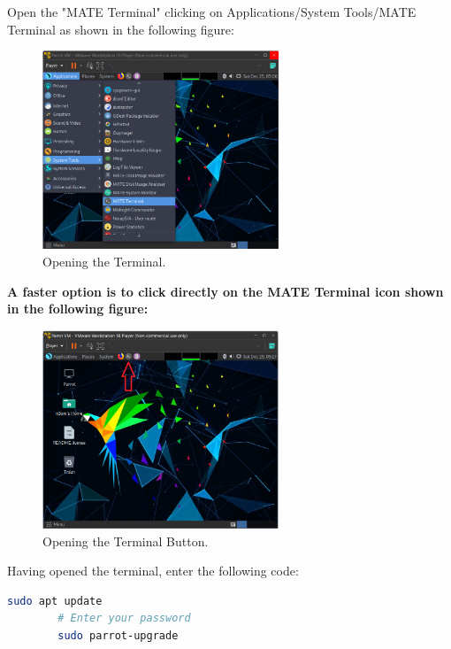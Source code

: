 \documentclass[a4paper]{article}
\newcommand\tab[1][1cm]{\hspace*{#1}}
\begin{document}
    \tab Open the "MATE Terminal" clicking on Applications/System Tools/MATE Terminal as shown in the following
    figure:

    \begin{figure}[h]
        \centering
        \includegraphics[width=0.63\textwidth, keepaspectratio]{Images/Updating_OS/Updating_1.png}
        \caption{Opening the Terminal.}
    \end{figure}

    \textbf{A faster option is to click directly on the MATE Terminal icon shown in the following figure:}

    \begin{figure}[h!]
        \centering
        \includegraphics[width=0.63\textwidth, keepaspectratio]{Images/Updating_OS/Updating_2.png}
        \caption{Opening the Terminal Button.}
    \end{figure}

    \tab Having opened the terminal, enter the following code:

    \begin{lstlisting}[language=Bash, caption=Updating Parrot OS]
        sudo apt update
        # Enter your password
        sudo parrot-upgrade
    \end{lstlisting}
\end{document}
